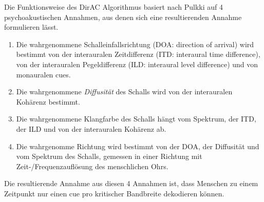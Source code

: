 Die Funktionsweise des DirAC Algorithmus basiert nach Pulkki \cite{pulkki} auf 4 psychoakustischen Annahmen, aus denen sich eine resultierenden Annahme formulieren lässt.

\begin{enumerate}
    \item Die wahrgenommene Schalleinfallsrichtung (DOA: direction of arrival) wird bestimmt von der interauralen Zeitdifferenz (ITD: interaural time difference), von der interauralen Pegeldifferenz (ILD: interaural level difference) und von monauralen cues.
    \item Die wahrgenommene \textit{Diffusität} des Schalls wird von der interauralen Kohärenz bestimmt.
    \item Die wahrgenommene Klangfarbe des Schalls hängt vom Spektrum, der ITD, der ILD und von der interauralen Kohärenz ab.
    \item Die wahrgenomme Richtung wird bestimmt von der DOA, der Diffusität und vom Spektrum des Schalls, gemessen in einer Richtung mit Zeit-/Frequenzauflösung des menschlichen Ohrs.
\end{enumerate}

Die resultierende Annahme aus diesen 4 Annahmen ist, dass Menschen zu einem Zeitpunkt nur einen cue pro kritischer Bandbreite dekodieren können.
